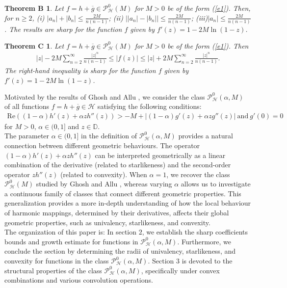 \documentclass[11pt,reqno]{amsart}
\newtheorem*{theoB}{Theorem B}
\newtheorem*{theoC}{Theorem C}
\newtheorem{open problem}{Open problem}[section]
\newcommand{\ol}{\overline}
\newcommand{\beas}{\begin{eqnarray*}}
\newcommand{\eeas}{\end{eqnarray*}}
\numberwithin{equation}{section}
\begin{document}
\begin{theoB}\cite{GA2020}
Let $f=h+\ol{g}\in \mathcal{P}_{\mathcal{H}}^0(M)$ for $M >0$ be of the form (\ref{e1}). Then, for $n\geq 2$, 
(i)  $|a_n|+|b_n|\leq \frac{2M}{n(n-1)}$; (ii) $\left||a_n|-|b_n|\right|\leq \frac{2M}{n(n-1)}$;
(iii)$|a_n|\leq\frac{2M}{n(n-1)}$.
The results are sharp for the function $f$ given by $f'(z)=1-2M\ln(1-z)$.
\end{theoB}
\begin{theoC} \cite{GA2020} Let $f=h+\ol{g}\in \mathcal{P}_{\mathcal{H}}^0(M)$ for $M >0$ be of the form (\ref{e1}). Then
\beas |z|-2M\sum_{n=2}^{\infty}\frac{|z|^{n}}{n(n-1)}\leq |f(z)|\leq |z|+2M\sum_{n=2}^{\infty}\frac{|z|^n}{n(n-1)}.\eeas
The right-hand inequality is sharp for the function $f$ given by $f'(z)=1-2M\ln(1-z)$.
\end{theoC}
\noindent Motivated by the results of Ghosh and Allu \cite{GA2020}, we consider the class $\mathcal{P}_{\mathcal{H}}^0(\alpha,M)$ of all functions $f=h+\ol{g}\in\mathcal{H}$ satisfying the following conditions:
\beas\text{Re}\left((1-\alpha)h'(z)+ \alpha zh''(z)\right)>-M+\left|(1-\alpha)g'(z)+\alpha zg''(z)\right|~\text{and}~ g'(0)=0\eeas
for $M>0$, $\alpha\in(0,1]$ and $z\in\mathbb{D}$. \\[2mm]
\indent The parameter $\alpha \in (0,1]$ in the definition of $\mathcal{P}_{\mathcal{H}}^0(\alpha,M)$ provides a natural connection between different geometric behaviours. The operator $(1-\alpha)h'(z) + \alpha zh''(z)$ can be interpreted geometrically as a linear combination of the derivative (related to starlikeness) and the second-order operator $zh''(z)$ (related to convexity). When $\alpha = 1$, we recover the class $\mathcal{P}_{\mathcal{H}}^0(M)$ studied by Ghosh and Allu \cite{GA2020},  whereas varying $\alpha$ allows us to investigate a continuous family of classes that connect different geometric properties. This generalization provides a more in-depth understanding of how the local behaviour of harmonic mappings, determined by their derivatives, affects their global geometric properties, such as univalency, starlikeness, and convexity.\\ [2mm]
The organization of this paper is:
In section $2$, we establish the sharp coefficients bounds and growth estimate for functions in $\mathcal{P}_{\mathcal{H}}^0(\alpha,M)$. Furthermore, 
 we conclude the section by determining the radii of univalency, starlikeness, and convexity for functions in the class $\mathcal{P}_{\mathcal{H}}^0(\alpha,M)$. 
 Section $3$ is devoted to the structural properties of the class $\mathcal{P}_{\mathcal{H}}^{0}(\alpha, M)$, specifically under convex combinations and various convolution operations.
\end{document}
